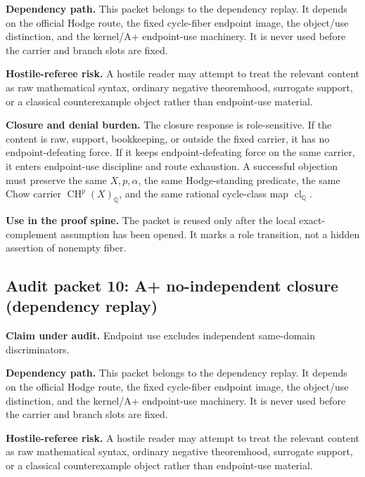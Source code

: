 \documentclass[11pt]{article}
\newcommand{\QQ}{\mathbb{Q}}
\newcommand{\CH}{\operatorname{CH}}
\newcommand{\clQ}{\operatorname{cl}_{\QQ}}
\begin{document}
\par\noindent\textbf{Dependency path.} This packet belongs to the dependency replay. It depends on the official Hodge route, the fixed cycle-fiber endpoint image, the object/use distinction, and the kernel/A+ endpoint-use machinery. It is never used before the carrier and branch slots are fixed.


\par\noindent\textbf{Hostile-referee risk.} A hostile reader may attempt to treat the relevant content as raw mathematical syntax, ordinary negative theoremhood, surrogate support, or a classical counterexample object rather than endpoint-use material.


\par\noindent\textbf{Closure and denial burden.} The closure response is role-sensitive. If the content is raw, support, bookkeeping, or outside the fixed carrier, it has no endpoint-defeating force. If it keeps endpoint-defeating force on the same carrier, it enters endpoint-use discipline and route exhaustion. A successful objection must preserve the same $X,p,\alpha$, the same Hodge-standing predicate, the same Chow carrier $\CH^p(X)_\QQ$, and the same rational cycle-class map $\clQ$.


\par\noindent\textbf{Use in the proof spine.} The packet is reused only after the local exact-complement assumption has been opened. It marks a role transition, not a hidden assertion of nonempty fiber.


\subsection{Audit packet 10: A+ no-independent closure (dependency replay)}


\par\noindent\textbf{Claim under audit.} Endpoint use excludes independent same-domain discriminators.


\par\noindent\textbf{Dependency path.} This packet belongs to the dependency replay. It depends on the official Hodge route, the fixed cycle-fiber endpoint image, the object/use distinction, and the kernel/A+ endpoint-use machinery. It is never used before the carrier and branch slots are fixed.


\par\noindent\textbf{Hostile-referee risk.} A hostile reader may attempt to treat the relevant content as raw mathematical syntax, ordinary negative theoremhood, surrogate support, or a classical counterexample object rather than endpoint-use material.
\end{document}
